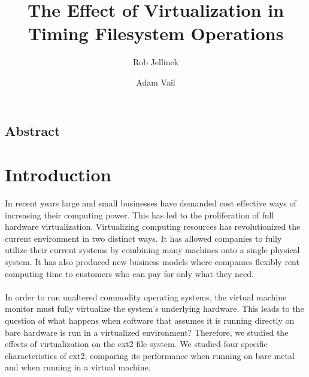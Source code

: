 \documentclass[letterpaper,twocolumn,10pt]{article}
\begin{document}
\date{}

\title{\Large \bf The Effect of Virtualization in Timing Filesystem Operations}

\author{
{\rm Rob Jellinek}\\
\and
{\rm Adam Vail}\\
} %

\maketitle

\thispagestyle{empty}


\subsection*{Abstract}

\section{Introduction}

In recent years large and small businesses have demanded cost effective ways of increasing their computing power.
This has led to the proliferation of full hardware virtualization.
Virtualizing computing resources has revolutionized the current environment in two distinct ways.
It has allowed companies to fully utilize their current systems by combining many machines onto a single physical system.
It has also produced new business models where companies flexibly rent computing time to customers who can pay for only what they need.

\paragraph{}
In order to run unaltered commodity operating systems, the virtual machine monitor must fully virtualize the system's underlying hardware.
This leads to the question of what happens when software that assumes it is running directly on bare hardware is run in a virtualized environment?
Therefore, we studied the effects of virtualization on the ext2 file system.
We studied four specific characteristics of ext2, comparing its performance when running on bare metal and when running in a virtual machine.
\end{document}
